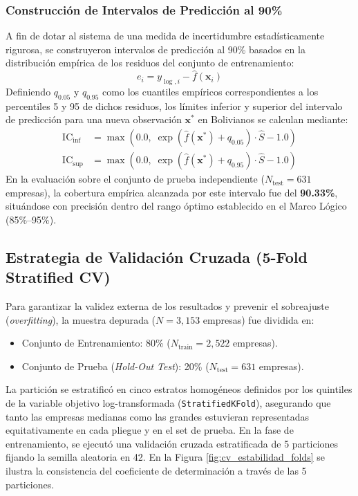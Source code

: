 \subsubsection{Construcción de Intervalos de Predicción al 90\%}
A fin de dotar al sistema de una medida de incertidumbre estadísticamente rigurosa, se construyeron intervalos de predicción al 90\% basados en la distribución empírica de los residuos del conjunto de entrenamiento:
\begin{equation}
    e_i = y_{\log, i} - \hat{f}(\mathbf{x}_i)
\end{equation}
Definiendo $q_{0.05}$ y $q_{0.95}$ como los cuantiles empíricos correspondientes a los percentiles 5 y 95 de dichos residuos, los límites inferior y superior del intervalo de predicción para una nueva observación $\mathbf{x}^*$ en Bolivianos se calculan mediante:
\begin{align}
    \text{IC}_{\text{inf}} &= \max\left(0.0, \; \exp\left( \hat{f}(\mathbf{x}^*) + q_{0.05} \right) \cdot \hat{S} - 1.0 \right) \label{eq:ic_inf} \\
    \text{IC}_{\text{sup}} &= \max\left(0.0, \; \exp\left( \hat{f}(\mathbf{x}^*) + q_{0.95} \right) \cdot \hat{S} - 1.0 \right) \label{eq:ic_sup}
\end{align}
En la evaluación sobre el conjunto de prueba independiente ($N_{\text{test}} = 631$ empresas), la cobertura empírica alcanzada por este intervalo fue del \textbf{90.33\%}, situándose con precisión dentro del rango óptimo establecido en el Marco Lógico (85\%--95\%).

\subsection{Estrategia de Validación Cruzada (5-Fold Stratified CV)}
Para garantizar la validez externa de los resultados y prevenir el sobreajuste (\textit{overfitting}), la muestra depurada ($N = 3,153$ empresas) fue dividida en:
\begin{itemize}
    \item Conjunto de Entrenamiento: 80\% ($N_{\text{train}} = 2,522$ empresas).
    \item Conjunto de Prueba (\textit{Hold-Out Test}): 20\% ($N_{\text{test}} = 631$ empresas).
\end{itemize}
La partición se estratificó en cinco estratos homogéneos definidos por los quintiles de la variable objetivo log-transformada (\texttt{StratifiedKFold}), asegurando que tanto las empresas medianas como las grandes estuvieran representadas equitativamente en cada pliegue y en el set de prueba. En la fase de entrenamiento, se ejecutó una validación cruzada estratificada de 5 particiones fijando la semilla aleatoria en 42. En la Figura \ref{fig:cv_estabilidad_folds} se ilustra la consistencia del coeficiente de determinación a través de las 5 particiones.

